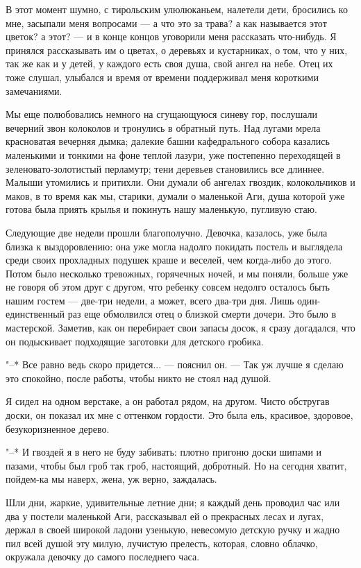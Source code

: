 В  этот  момент  шумно,   с  тирольским  улюлюканьем,  налетели  дети,
бросились ко  мне, засыпали меня вопросами  --- а что это  за трава? а
как называется  этот цветок? а  этот? ---  и в конце  концов уговорили
меня рассказать  что-нибудь. Я  принялся рассказывать  им о  цветах, о
деревьях и  кустарниках, о том,  что у  них, так же  как и у  детей, у
каждого  есть своя  душа, свой  ангел на  небе. Отец  их тоже  слушал,
улыбался и время от времени поддерживал меня короткими замечаниями.

Мы  еще  полюбовались немного  на  сгущающуюся  синеву гор,  послушали
вечерний  звон  колоколов и  тронулись  в  обратный путь.  Над  лугами
мрела красноватая  вечерняя дымка; далекие башни  кафедрального собора
казались маленькими  и тонкими на  фоне теплой лазури,  уже постепенно
переходящей   в   зеленовато-золотистый   перламутр;   тени   деревьев
становились все  длиннее. Малыши утомились  и притихли. Они  думали об
ангелах гвоздик,  колокольчиков и маков,  в то время как  мы, старики,
думали о маленькой  Аги, душа которой уже готова была  приять крылья и
покинуть нашу маленькую, пугливую стаю.

Следующие две недели прошли  благополучно. Девочка, казалось, уже была
близка  к  выздоровлению:  она  уже  могла  надолго  покидать  постель
и  выглядела  среди своих  прохладных  подушек  краше и  веселей,  чем
когда-либо до этого. Потом было несколько тревожных, горячечных ночей,
и мы поняли, больше  уже не говоря об этом друг  с другом, что ребенку
совсем недолго осталось быть нашим гостем --- две-три недели, а может,
всего два-три  дня. Лишь один-единственный  раз еще обмолвился  отец о
близкой  смерти  дочери.  Это  было  в  мастерской.  Заметив,  как  он
перебирает свои  запасы досок, я  сразу догадался, что  он подыскивает
подходящие заготовки для детского гробика.

"--* Все равно ведь скоро придется... --- пояснил он. --- Так уж лучше
я сделаю это спокойно, после работы, чтобы никто не стоял над душой.

Я  сидел на  одном  верстаке, а  он работал  рядом,  на другом.  Чисто
обстругав доски, он показал их мне  с оттенком гордости. Это была ель,
красивое, здоровое, безукоризненное дерево.

"--* И гвоздей я в него  не буду забивать: плотно пригоню доски шипами
и пазами, чтобы был гроб так гроб, настоящий, добротный. Но на сегодня
хватит, пойдем-ка мы наверх, жена, уж верно, заждалась.

Шли дни, жаркие,  удивительные летние дни; я каждый  день проводил час
или два у  постели маленькой Аги, рассказывал ей о  прекрасных лесах и
лугах, держал в своей широкой ладони узенькую, невесомую детскую ручку
и жадно пил  всей душой эту милую, лучистую  прелесть, которая, словно
облачко, окружала девочку до самого последнего часа.

